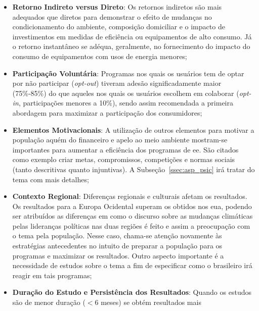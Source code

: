 \begin{itemize}
\item \textbf{Retorno Indireto versus Direto}: 
Os retornos indiretos são mais adequados que diretos 
para demonstrar o efeito de mudanças no condicionamento do ambiente, 
composição domiciliar e o impacto de investimentos 
em medidas de eficiência ou equipamentos de alto consumo. Já o retorno instantâneo 
se adéqua, geralmente, no fornecimento do impacto do consumo de equipamentos com 
usos de energia menores;
\item \textbf{Participação Voluntária}: Programas nos quais os usuários tem de
optar por não participar (\emph{opt-out}) tiveram adesão significadamente 
maior (75\%-85\%) do que aqueles nos quais os usuários escolhem em colaborar
(\emph{opt-in}, participações menores a 10\%), sendo assim recomendada
a primeira abordagem para maximizar a participação dos consumidores;
\item \textbf{Elementos Motivacionais}: A utilização de outros elementos para
motivar a população aquém do financeiro e apelo ao meio ambiente mostram-se 
importantes para aumentar a eficiência dos programas de \gls{ee}. São citados
como exemplo criar metas, compromissos, competições e normas sociais 
(tanto descritivas quanto injuntivas). A Subseção~\ref{ssec:asp_psic} 
irá tratar do tema com mais detalhes;
\item \textbf{Contexto Regional}: Diferenças regionais e culturais afetam os 
resultados. Os resultados para a Europa Ocidental superam os obtidos nos
\gls{eua}, podendo ser atribuídos as diferenças em como o 
discurso sobre as mudanças climáticas pelas lideranças políticas nas duas regiões 
é feito e assim a preocupação com o tema pela população. Nesse caso, chama-se atenção
novamente às estratégias antecedentes no intuito de preparar a população para os programas e
maximizar os resultados. Outro aspecto importante é a necessidade de estudos
sobre o tema a fim de especificar como o brasileiro irá reagir em tais programas;
\item \textbf{Duração do Estudo e Persistência dos Resultados}: Quando os 
estudos são de menor duração ($< 6$ meses) se obtém resultados mais 

\end{itemize}
